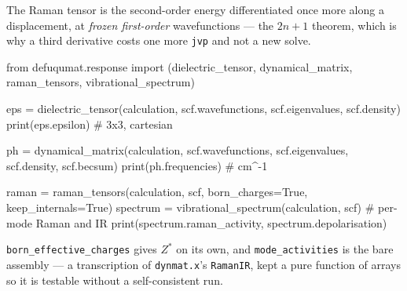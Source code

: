 \documentclass[11pt,a4paper]{article}
\newcommand{\code}[1]{\texttt{\small #1}}
\begin{document}
The Raman tensor is the second-order energy differentiated once more along a
displacement, at \emph{frozen first-order} wavefunctions --- the $2n{+}1$
theorem, which is why a third derivative costs one more \code{jvp} and not a new
solve.

\begin{pycode}
from defuqumat.response import (dielectric_tensor, dynamical_matrix,
                               raman_tensors, vibrational_spectrum)

eps = dielectric_tensor(calculation, scf.wavefunctions, scf.eigenvalues,
                        scf.density)
print(eps.epsilon)                     # 3x3, cartesian

ph = dynamical_matrix(calculation, scf.wavefunctions, scf.eigenvalues,
                      scf.density, scf.becsum)
print(ph.frequencies)                  # cm^-1

raman = raman_tensors(calculation, scf, born_charges=True, keep_internals=True)
spectrum = vibrational_spectrum(calculation, scf)   # per-mode Raman and IR
print(spectrum.raman_activity, spectrum.depolarisation)
\end{pycode}

\code{born\_effective\_charges} gives $Z^{\ast}$ on its own, and
\code{mode\_activities} is the bare assembly --- a transcription of
\code{dynmat.x}'s \code{RamanIR}, kept a pure function of arrays so it is
testable without a self-consistent run.
\end{document}
